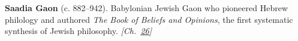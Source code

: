 \textbf{Saadia Gaon} (c. 882–942). Babylonian Jewish Gaon who pioneered Hebrew philology and authored \emph{The Book of Beliefs and Opinions}, the first systematic synthesis of Jewish philosophy. \emph{[Ch.~\hyperref[ch:jewishcalendar]{26}]}

